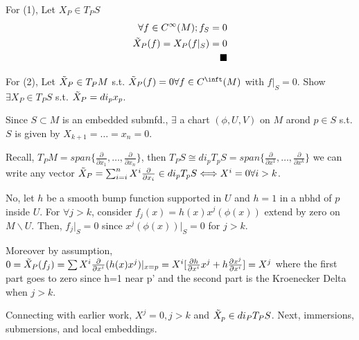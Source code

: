 \documentclass[12pt,letterpaper]{article}
\begin{document}
For (1), Let $X_P \in T_P S$
\begin{align*}
    \forall f \in C^{\infty } (M); f_S = 0 \\ 
    \Tilde{X}_P(f) = X_P (f|_S) = 0 \\
    \blacksquare
\end{align*}

For (2), Let $\Tilde{X}_P \in T_P M$ s.t. $\Tilde{X}_P (f) = 0 \forall f \in C^{\inft}(M)$ with $f|_S=0$. Show $\exists X_P \in T_P S$ s.t. $\Tilde{X}_P = di_p x_p$. 

Since $S \subset M$ is an embedded submfd., $\exists$ a chart $(\phi, U, V)$ on $M$ arond $p \in S$ s.t. $S$ is given by $X_{k+1} = \dots = x_n = 0$.

Recall, $T_P M = span \{ \frac{\partial}{\partial x_1}, \dots , \frac{\partial}{\partial x_n}\}$, then $T_P S \cong di_p T_p S = span \{ \frac{\partial}{\partial x^1}, \dots, \frac{\partial}{\partial x^k}\}$ we can write any vector $ \Tilde{X}_P = \sum_{i=i}^n X^i \frac{\partial}{\partial x_i} \in di_p T_p S \Longleftrightarrow X^i = 0 \forall i > k$. 

No, let $h$ be a smooth bump function supported in $U$ and $h=1$ in a nbhd of $p$ inside $U$. For $\forall j > k$, consider $f_j (x) = h(x) x^j (\phi (x))$ extend by zero on $M\backslash U$. Then, $f_j |_S = 0$ since $x^j (\phi (x)) |_S = 0$ for $j > k$. 

Moreover by assumption, $0 = \Tilde{X}_P (f_j) = \sum X^i \frac{\partial }{\partial x^i}(h(x) x^j)|_{x=p} = X^i [ \frac{\partial h}{\partial x^i} x^j + h \frac{\partial x^j}{\partial x^i}] = X^j$ where the first part goes to zero since h=1 near p' and the second part is the Kroenecker Delta when $j > k$. 

Connecting with earlier work, $X^j = 0, j>k$ and $\Tilde{X}_p \in di_P T_P S$. Next, immersions, submersions, and local embeddings. 
\end{document}
